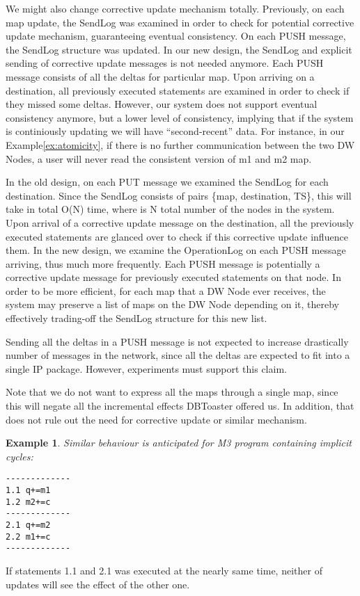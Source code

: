 \documentclass{sig-semester}
\newtheorem{example}[theorem]{Example}
\begin{document}
We might also change corrective update mechanism totally. Previously, on each map update, the SendLog was examined in order to check for potential corrective update mechanism, guaranteeing eventual consistency. On each PUSH message, the SendLog structure was updated. In our new design, the SendLog and explicit sending of corrective update messages is not needed anymore. Each PUSH message consists of all the deltas for particular map. Upon arriving on a destination, all previously executed statements are examined in order to check if they missed some deltas. However, our system does not support eventual consistency anymore, but a lower level of consistency, implying that if the system is continiously updating we will have ``second-recent'' data. For instance, in our Example\ref{ex:atomicity}, if there is no further communication between the two DW Nodes, a user will never read the consistent version of m1 and m2 map.

In the old design, on each PUT message we examined the SendLog for each destination. Since the SendLog consists of pairs \{map, destination, TS\}, this will take in total O(N) time, where is N total number of the nodes in the system. Upon arrival of a corrective update message on the destination, all the previously executed statements are glanced over to check if this corrective update influence them. In the new design, we examine the OperationLog on each PUSH message arriving, thus much more frequently. Each PUSH message is potentially a corrective update message for previously executed statements on that node. In order to be more efficient, for each map that a DW Node ever receives, the system may preserve a list of maps on the DW Node depending on it, thereby effectively trading-off the SendLog structure for this new list.

Sending all the deltas in a PUSH message is not expected to increase drastically number of messages in the network, since all the deltas are expected to fit into a single IP package. However, experiments must support this claim.

Note that we do not want to express all the maps through a single map, since this will negate all the incremental effects DBToaster offered us. In addition, that does not rule out the need for corrective update or similar mechanism.

\begin{example} \em
\label{ex:M3Program}
Similar behaviour is anticipated for M3 program containing implicit cycles:
\begin{verbatim}
-------------
1.1 q+=m1
1.2 m2+=c
-------------
2.1 q+=m2
2.2 m1+=c
-------------
\end{verbatim}
\end{example}
If statements 1.1 and 2.1 was executed at the nearly same time, neither of updates will see the effect of the other one.
\end{document}
